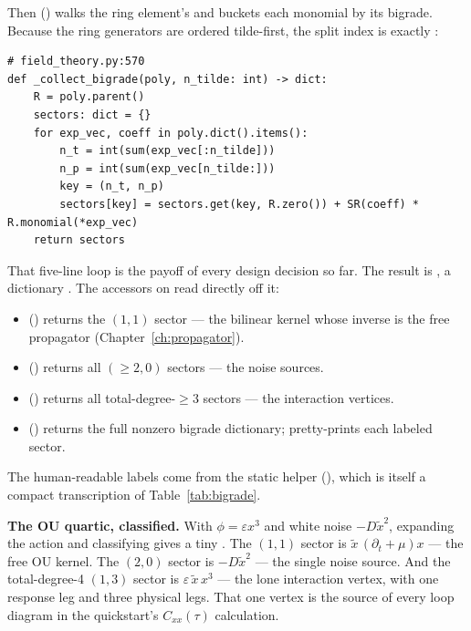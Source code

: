 Then  () walks the ring
element's  and buckets each monomial by its bigrade. Because the ring
generators are ordered tilde-first, the split index is exactly :

\begin{lstlisting}
# field_theory.py:570
def _collect_bigrade(poly, n_tilde: int) -> dict:
    R = poly.parent()
    sectors: dict = {}
    for exp_vec, coeff in poly.dict().items():
        n_t = int(sum(exp_vec[:n_tilde]))
        n_p = int(sum(exp_vec[n_tilde:]))
        key = (n_t, n_p)
        sectors[key] = sectors.get(key, R.zero()) + SR(coeff) * R.monomial(*exp_vec)
    return sectors
\end{lstlisting}

That five-line loop is the payoff of every design decision so far. The result is
, a dictionary . The
accessors on  read directly off it:

\begin{itemize}
  \item {} () returns the $(1,1)$
        sector --- the bilinear kernel whose inverse is the free propagator
        (Chapter~\ref{ch:propagator}).
  \item {} () returns all
        $(\ge 2,0)$ sectors --- the noise sources.
  \item {} () returns all
        total-degree-$\ge 3$ sectors --- the interaction vertices.
  \item {} () returns the full nonzero
        bigrade dictionary;  pretty-prints each labeled sector.
\end{itemize}

The human-readable labels come from the static helper 
(), which is itself a compact transcription of
Table~\ref{tab:bigrade}.

\begin{example}
\textbf{The OU quartic, classified.} With $\phi=\varepsilon x^3$ and white noise
$-D\tilde x^2$, expanding the action and classifying gives a tiny .
The $(1,1)$ sector is $\tilde x\,(\partial_t+\mu)x$ --- the free OU kernel. The
$(2,0)$ sector is $-D\tilde x^2$ --- the single noise source. And the
total-degree-4 $(1,3)$ sector is $\varepsilon\,\tilde x\,x^3$ --- the lone
interaction vertex, with one response leg and three physical legs. That one vertex
is the source of every loop diagram in the quickstart's $C_{xx}(\tau)$ calculation.
\end{example}


